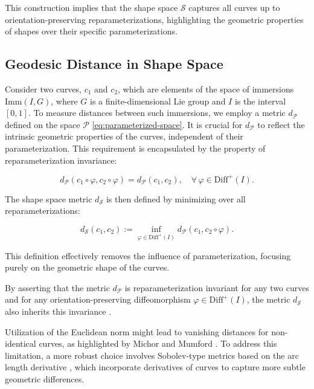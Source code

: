 This construction implies that the shape space \(\mathcal{S}\) captures all curves up to orientation-preserving reparameterizations, highlighting the geometric properties of shapes over their specific parameterizations.

\subsection{Geodesic Distance in Shape Space}
\label{subsec:geodesic-distance}

Consider two curves, \(c_1\) and \(c_2\), which are elements of the space of immersions \(\mathrm{Imm}(I, G)\), where \(G\) is a finite-dimensional Lie group and \(I\) is the interval \([0,1]\). To measure distances between such immersions, we employ a metric \(d_{\mathcal{P}}\) defined on the space \(\mathcal{P}\) \eqref{eq:parameterized-space}. It is crucial for \(d_{\mathcal{P}}\) to reflect the intrinsic geometric properties of the curves, independent of their parameterization. This requirement is encapsulated by the property of reparameterization invariance:

\begin{equation}
    d_{\mathcal{P}}(c_1 \circ \varphi, c_2 \circ \varphi) = d_{\mathcal{P}}(c_1, c_2), \quad \forall \, \varphi \in \mathrm{Diff}^+(I).
    \label{eq:reparameterization-invariance}
\end{equation}

The shape space metric \(d_{\mathcal{S}}\) is then defined by minimizing over all reparameterizations:

\begin{equation}
    d_{\mathcal{S}}(c_1, c_2) := \inf_{\varphi \in \mathrm{Diff}^+(I)} d_{\mathcal{P}}(c_1, c_2 \circ \varphi).
    \label{eq:shape-space-metric}
\end{equation}

This definition effectively removes the influence of parameterization, focusing purely on the geometric shape of the curves.

By asserting that the metric \(d_{\mathcal{P}}\) is reparameterization invariant for any two curves and for any orientation-preserving diffeomorphism \(\varphi \in \mathrm{Diff}^+(I)\), the metric \(d_{\mathcal{S}}\) also inherits this invariance \cite[Lemma 3.4]{celledoniShapeAnalysisLie2016}.

Utilization of the Euclidean norm might lead to vanishing distances for non-identical curves, as highlighted by Michor and Mumford \cite{michorVanishingGeodesicDistance2004}. To address this limitation, a more robust choice involves Sobolev-type metrics based on the arc length derivative \cite{michorOverviewRiemannianMetrics2007a}, which incorporate derivatives of curves to capture more subtle geometric differences.

